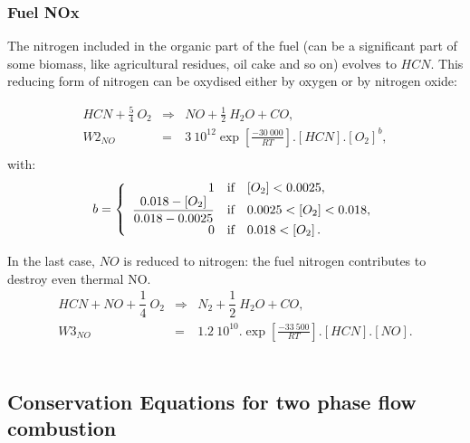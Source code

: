 \subsubsection{Fuel NOx}
The nitrogen included in the organic part of the fuel (can be a significant part
of some biomass, like agricultural residues, oil cake and so on) evolves to
$HCN$. This reducing form of nitrogen can be oxydised either by oxygen or by
nitrogen oxide:

\begin{eqnarray*}
HCN + \frac{5}{4}~ O_{2} &\Rightarrow& NO + \frac{1}{2} ~H_{2}O + CO  ,\\
 W2_{NO} &=& 3 \medspace10^{12} \exp \left[\frac{- 30\medspace000}{RT}\right].\left[ HCN \right] . \left[O_{2}\right]^{\textstyle b},\\
\end{eqnarray*}
with:
\begin{equation*}
b = \left\{
\begin{array}{r c l }
1 &\text{if}&\left[O_{2}\right] < 0.0025, \\
\dfrac{0.018-\left[O_{2}\right]}{0.018-0.0025} & \text{if} &0.0025 < \left[O_{2}\right] < 0.018, \\
0 & \text{if} &0.018 < \left[O_{2}\right].
\end{array}
\right.
\end{equation*}

In the last case, $NO$ is reduced to nitrogen: the fuel nitrogen contributes to destroy even thermal NO.
\begin{eqnarray*}
 HCN + NO + \dfrac{1}{4}~ O_{2} &\Rightarrow& N_{2} + \dfrac{1}{2}~ H_{2}O + CO ,  \\
 W3_{NO} &=& 1.2 \medspace 10^{10}  .  \exp \left[\frac{-33\medspace500}{RT}\right].\left[ HCN \right] . \left[NO\right] .
\end{eqnarray*}
\


\subsection[Conservation Equations]{Conservation Equations for two phase flow combustion}

